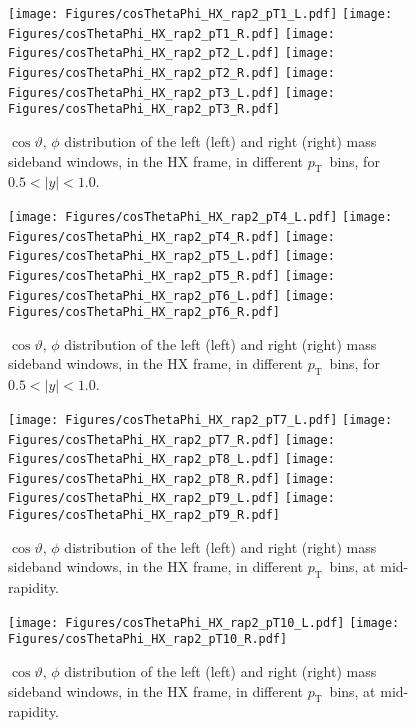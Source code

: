 \documentclass[12pt]{article}
\newcommand{\pt}{$p_{\mathrm{T}}$}
\begin{document}
\begin{figure}[htbp]
\centering
\texttt{[image: Figures/cosThetaPhi\_HX\_rap2\_pT1\_L.pdf]}
\texttt{[image: Figures/cosThetaPhi\_HX\_rap2\_pT1\_R.pdf]}
\texttt{[image: Figures/cosThetaPhi\_HX\_rap2\_pT2\_L.pdf]}
\texttt{[image: Figures/cosThetaPhi\_HX\_rap2\_pT2\_R.pdf]}
\texttt{[image: Figures/cosThetaPhi\_HX\_rap2\_pT3\_L.pdf]}
\texttt{[image: Figures/cosThetaPhi\_HX\_rap2\_pT3\_R.pdf]}
\caption{$\cos\vartheta,\,\phi$ distribution of the left (left) and
  right (right) mass sideband windows, in the HX frame, in different
  \pt\ bins, for $0.5 < |y| < 1.0$.}
\end{figure}
\clearpage

\begin{figure}[htbp]
\centering
\texttt{[image: Figures/cosThetaPhi\_HX\_rap2\_pT4\_L.pdf]}
\texttt{[image: Figures/cosThetaPhi\_HX\_rap2\_pT4\_R.pdf]}
\texttt{[image: Figures/cosThetaPhi\_HX\_rap2\_pT5\_L.pdf]}
\texttt{[image: Figures/cosThetaPhi\_HX\_rap2\_pT5\_R.pdf]}
\texttt{[image: Figures/cosThetaPhi\_HX\_rap2\_pT6\_L.pdf]}
\texttt{[image: Figures/cosThetaPhi\_HX\_rap2\_pT6\_R.pdf]}
\caption{$\cos\vartheta,\,\phi$ distribution of the left (left) and
  right (right) mass sideband windows, in the HX frame, in different
  \pt\ bins, for $0.5 < |y| < 1.0$.} 
\end{figure}
\clearpage

\begin{figure}[htbp]
\centering
\texttt{[image: Figures/cosThetaPhi\_HX\_rap2\_pT7\_L.pdf]}
\texttt{[image: Figures/cosThetaPhi\_HX\_rap2\_pT7\_R.pdf]}
\texttt{[image: Figures/cosThetaPhi\_HX\_rap2\_pT8\_L.pdf]}
\texttt{[image: Figures/cosThetaPhi\_HX\_rap2\_pT8\_R.pdf]}
\texttt{[image: Figures/cosThetaPhi\_HX\_rap2\_pT9\_L.pdf]}
\texttt{[image: Figures/cosThetaPhi\_HX\_rap2\_pT9\_R.pdf]}
\caption{$\cos\vartheta,\,\phi$ distribution of the left (left) and
  right (right) mass sideband windows, in the HX frame, in different
  \pt\ bins, at mid-rapidity.}
\end{figure}
\clearpage

\begin{figure}[htbp]
\centering
\texttt{[image: Figures/cosThetaPhi\_HX\_rap2\_pT10\_L.pdf]}
\texttt{[image: Figures/cosThetaPhi\_HX\_rap2\_pT10\_R.pdf]}
\caption{$\cos\vartheta,\,\phi$ distribution of the left (left) and
  right (right) mass sideband windows, in the HX frame, in different
  \pt\ bins, at mid-rapidity.} 
\end{figure}
\clearpage
\end{document}
